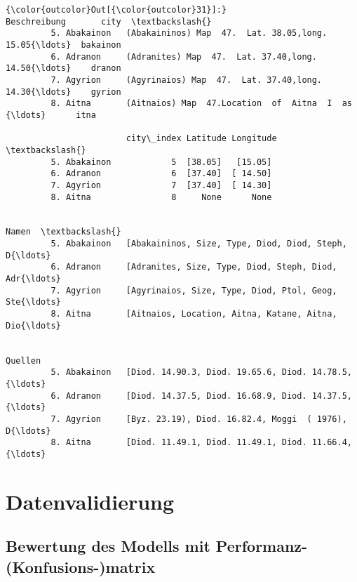 \documentclass[10pt]{article}
\begin{document}
            \begin{Verbatim}[commandchars=\\\{\}]
{\color{outcolor}Out[{\color{outcolor}31}]:}                                                     Beschreibung       city  \textbackslash{}
         5. Abakainon   (Abakaininos) Map  47.  Lat. 38.05,long. 15.05{\ldots}  bakainon    
         6. Adranon     (Adranites) Map  47.  Lat. 37.40,long.  14.50{\ldots}    dranon    
         7. Agyrion     (Agyrinaios) Map  47.  Lat. 37.40,long.  14.30{\ldots}    gyrion    
         8. Aitna       (Aitnaios) Map  47.Location  of  Aitna  I  as {\ldots}      itna    
         
                        city\_index Latitude Longitude  \textbackslash{}
         5. Abakainon            5  [38.05]   [15.05]   
         6. Adranon              6  [37.40]  [ 14.50]   
         7. Agyrion              7  [37.40]  [ 14.30]   
         8. Aitna                8     None      None   
         
                                                                    Namen  \textbackslash{}
         5. Abakainon   [Abakaininos, Size, Type, Diod, Diod, Steph, D{\ldots}   
         6. Adranon     [Adranites, Size, Type, Diod, Steph, Diod, Adr{\ldots}   
         7. Agyrion     [Agyrinaios, Size, Type, Diod, Ptol, Geog, Ste{\ldots}   
         8. Aitna       [Aitnaios, Location, Aitna, Katane, Aitna, Dio{\ldots}   
         
                                                                  Quellen  
         5. Abakainon   [Diod. 14.90.3, Diod. 19.65.6, Diod. 14.78.5, {\ldots}  
         6. Adranon     [Diod. 14.37.5, Diod. 16.68.9, Diod. 14.37.5, {\ldots}  
         7. Agyrion     [Byz. 23.19), Diod. 16.82.4, Moggi  ( 1976), D{\ldots}  
         8. Aitna       [Diod. 11.49.1, Diod. 11.49.1, Diod. 11.66.4, {\ldots}  
\end{Verbatim}
        
    \section{Datenvalidierung}\label{datenvalidierung}

    \subsection{Bewertung des Modells mit Performanz-
(Konfusions-)matrix}\label{bewertung-des-modells-mit-performanz--konfusions-matrix}
\end{document}
